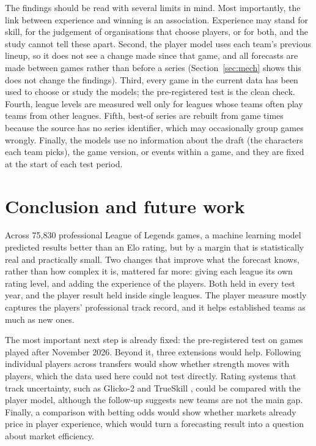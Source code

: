 \documentclass[12pt,a4paper]{article}
\begin{document}
The findings should be read with several limits in mind. Most importantly, the link between experience and winning is an association. Experience may stand for skill, for the judgement of organisations that choose players, or for both, and the study cannot tell these apart. Second, the player model uses each team's previous lineup, so it does not see a change made since that game, and all forecasts are made between games rather than before a series (Section~\ref{sec:mech} shows this does not change the findings). Third, every game in the current data has been used to choose or study the models; the pre-registered test is the clean check. Fourth, league levels are measured well only for leagues whose teams often play teams from other leagues. Fifth, best-of series are rebuilt from game times because the source has no series identifier, which may occasionally group games wrongly. Finally, the models use no information about the draft (the characters each team picks), the game version, or events within a game, and they are fixed at the start of each test period.

\section{Conclusion and future work}

Across 75,830 professional League of Legends games, a machine learning model predicted results better than an Elo rating, but by a margin that is statistically real and practically small. Two changes that improve what the forecast knows, rather than how complex it is, mattered far more: giving each league its own rating level, and adding the experience of the players. Both held in every test year, and the player result held inside single leagues. The player measure mostly captures the players' professional track record, and it helps established teams as much as new ones.

The most important next step is already fixed: the pre-registered test on games played after November 2026. Beyond it, three extensions would help. Following individual players across transfers would show whether strength moves with players, which the data used here could not test directly. Rating systems that track uncertainty, such as Glicko-2 \citep{glickman2001} and TrueSkill \citep{herbrich2007}, could be compared with the player model, although the follow-up suggests new teams are not the main gap. Finally, a comparison with betting odds would show whether markets already price in player experience, which would turn a forecasting result into a question about market efficiency.
\end{document}
